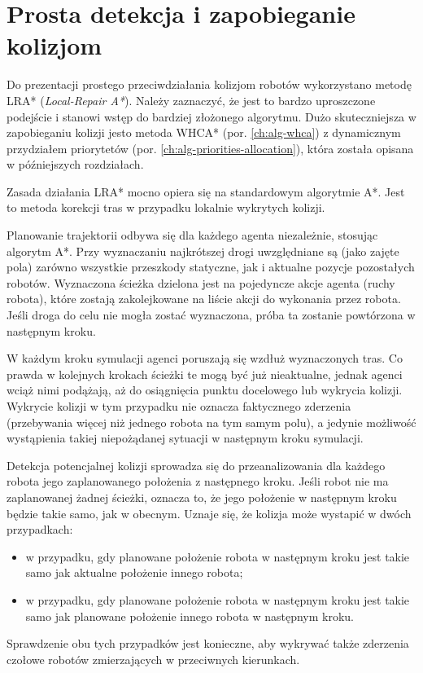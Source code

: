\section{Prosta detekcja i zapobieganie kolizjom}
\label{ch:alg-collision-avoid}

Do prezentacji prostego przeciwdziałania kolizjom robotów wykorzystano metodę LRA* ({\it Local-Repair A*}).
Należy zaznaczyć, że jest to bardzo uproszczone podejście i stanowi wstęp do bardziej złożonego algorytmu.
Dużo skuteczniejsza w zapobieganiu kolizji jesto metoda WHCA* (por. \ref{ch:alg-whca}) z dynamicznym przydziałem priorytetów (por. \ref{ch:alg-priorities-allocation}), która została opisana w późniejszych rozdziałach.

Zasada działania LRA* mocno opiera się na standardowym algorytmie A*. Jest to metoda korekcji tras w przypadku lokalnie wykrytych kolizji.

Planowanie trajektorii odbywa się dla każdego agenta niezależnie, stosując algorytm A*. Przy wyznaczaniu najkrótszej drogi uwzględniane są (jako zajęte pola) zarówno wszystkie przeszkody statyczne, jak i aktualne pozycje pozostałych robotów. Wyznaczona ścieżka dzielona jest na pojedyncze akcje agenta (ruchy robota), które zostają zakolejkowane na liście akcji do wykonania przez robota. Jeśli droga do celu nie mogła zostać wyznaczona, próba ta zostanie powtórzona w następnym kroku.

W każdym kroku symulacji agenci poruszają się wzdłuż wyznaczonych tras. Co prawda w kolejnych krokach ścieżki te mogą być już nieaktualne, jednak agenci wciąż nimi podążają, aż do osiągnięcia punktu docelowego lub wykrycia kolizji.
Wykrycie kolizji w tym przypadku nie oznacza faktycznego zderzenia (przebywania więcej niż jednego robota na tym samym polu), a jedynie możliwość wystąpienia takiej niepożądanej sytuacji w następnym kroku symulacji.

Detekcja potencjalnej kolizji sprowadza się do przeanalizowania dla każdego robota jego zaplanowanego położenia z następnego kroku. Jeśli robot nie ma zaplanowanej żadnej ścieżki, oznacza to, że jego położenie w następnym kroku będzie takie samo, jak w obecnym. Uznaje się, że kolizja może wystapić w dwóch przypadkach:
\begin{itemize}
	\item w przypadku, gdy planowane położenie robota w następnym kroku jest takie samo jak aktualne położenie innego robota;
	\item w przypadku, gdy planowane położenie robota w następnym kroku jest takie samo jak planowane położenie innego robota w następnym kroku.
\end{itemize}
Sprawdzenie obu tych przypadków jest konieczne, aby wykrywać także zderzenia czołowe robotów zmierzających w przeciwnych kierunkach.

